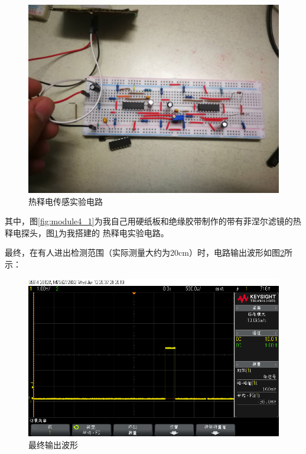 \documentclass{article}
\begin{document}
\begin{spacing}{1.5}
\begin{enumerate}
    \begin{figure}[H]
        \centering
        \includegraphics[scale=0.1]{fig/result/module4_2.png}
        \caption{热释电传感实验电路}
        \label{fig:module4_2}
    \end{figure}
    
    其中，图\ref{fig:module4_1}为我自己用硬纸板和绝缘胶带制作的带有菲涅尔滤镜的热释电探头，图\ref{fig:module4_2}为我搭建的
    热释电实验电路。

    最终，在有人进出检测范围（实际测量大约为20cm）时，电路输出波形如图\ref{fig:module4_result1}所示：

    \begin{figure}[H]
        \centering
        \includegraphics[scale=0.3]{fig/result/module4_result1.png}
        \caption{最终输出波形}
        \label{fig:module4_result1}
    \end{figure}
    

\end{enumerate}
\end{spacing}
\end{document}
